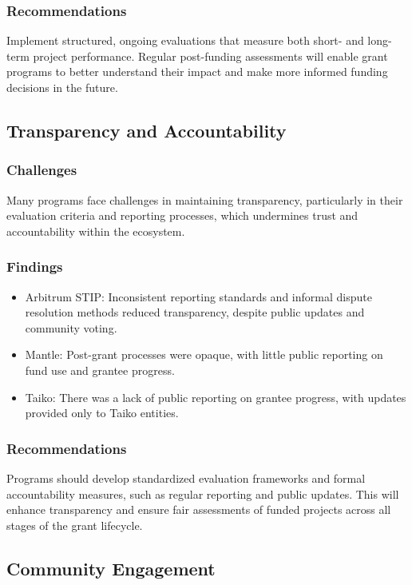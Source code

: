 \documentclass[a4,10pt]{article}
\begin{document}
\subsubsection{Recommendations}\label{sec_9.4.3}
Implement structured, ongoing evaluations that measure both short- and long-term project performance. Regular post-funding assessments will enable grant programs to better understand their impact and make more informed funding decisions in the future.

\subsection{Transparency and Accountability}\label{sec_9.5}

\subsubsection{Challenges}\label{sec_9.5.1}
Many programs face challenges in maintaining transparency, particularly in their evaluation criteria and reporting processes, which undermines trust and accountability within the ecosystem.

\subsubsection{Findings}\label{sec_9.5.2}
\begin{itemize}
    \item Arbitrum STIP: Inconsistent reporting standards and informal dispute resolution methods reduced transparency, despite public updates and community voting.
    \item Mantle: Post-grant processes were opaque, with little public reporting on fund use and grantee progress.
    \item Taiko: There was a lack of public reporting on grantee progress, with updates provided only to Taiko entities.
\end{itemize}

\subsubsection{Recommendations}\label{sec_9.5.3}
Programs should develop standardized evaluation frameworks and formal accountability measures, such as regular reporting and public updates. This will enhance transparency and ensure fair assessments of funded projects across all stages of the grant lifecycle.

\subsection{Community Engagement}\label{sec_9.6}
\end{document}
